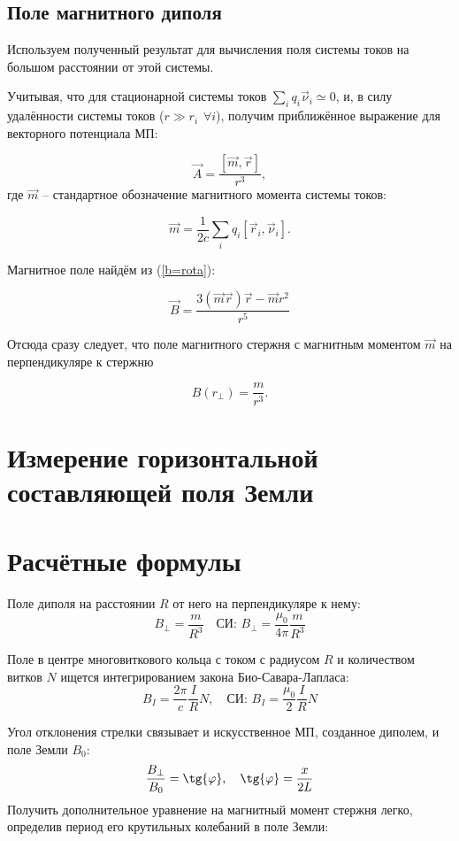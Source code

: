 \documentclass[a4paper, 12pt]{article}
\begin{document}
\subsection*{Поле магнитного диполя}
{

Используем полученный результат для вычисления поля системы токов на большом расстоянии от этой системы.

Учитывая, что для стационарной системы токов $\sum\limits_{i} q_i \vec \nu_i \simeq 0 $, и, в силу удалённости системы токов ($ r \gg r_i \hspace{5pt}\forall i$), получим приближённое выражение для векторного потенциала МП:

$$\vec A = \frac{[\vec m, \vec r]}{r^3},$$
где $\vec m$ -- стандартное обозначение магнитного момента системы токов:

$$\vec m = \frac{1}{2c}\sum\limits_{i} q_i[\vec r_i, \vec \nu_i].$$ 

Магнитное поле найдём из (\ref{b=rota}):

$$ \vec B = \frac{3(\vec m \vec r)\vec r - \vec m r^2}{r^5}$$

Отсюда сразу следует, что поле магнитного стержня с магнитным моментом $\vec m$ на перпендикуляре к стержню 

$$B(r_\perp) = \frac{m}{r^3}.$$
}

\section{Измерение горизонтальной составляющей поля Земли}
\section*{Расчётные формулы}
Поле диполя на расстоянии $R$ от него на перпендикуляре к нему:
\begin{equation}
B_\perp = \frac{m}{R^3}  \quad \text{СИ: } B_\perp=\frac{\mu_0}{4\pi}\frac{m}{R^3}
\end{equation}

Поле в центре многовиткового кольца с током с радиусом $R$ и количеством витков $N$ ищется интегрированием закона Био-Савара-Лапласа:
\begin{equation}\label{circlecurrent}
B_I=\frac{2\pi}{c}\frac{I}{R}N, \quad \text{СИ: } B_I=\frac{\mu_0}{2}\frac{I}{R}N
\end{equation}


Угол отклонения стрелки связывает и искусственное МП, созданное диполем, и поле Земли $B_0$:
$$ \frac{B_{\perp}}{B_0} = \tg{\varphi},\quad \tg{\varphi} = \frac{x}{2L}$$
Получить дополнительное уравнение на магнитный момент стержня легко, определив период его крутильных колебаний в поле Земли:
\end{document}
